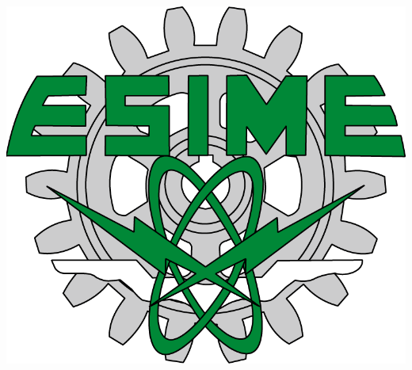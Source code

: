 \documentclass[12pt, twoside]{report}
\begin{document}
        \begin{minipage}[c][0.81\textheight][t]{0.22\textwidth}
            \begin{center}
               \color{Black}\vrule width1pt height16cm 
                \vspace{5mm}
                \hskip2pt
                \color{Black}\vrule width1pt height16cm
                \hskip2mm
                \color{Black}\vrule width1pt height16cm \\
                \includegraphics[scale=0.14]{recursos/esime.png}
            \end{center}
        \end{minipage}
\end{document}
